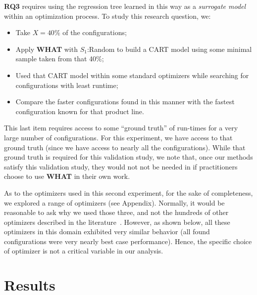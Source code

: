 \documentclass{sig-alternative}
\newcommand{\bi}{\begin{itemize}}%
\newcommand{\ei}{\end{itemize}}
\newcommand{\what}{{\bf WHAT }}
\begin{document}
{\bf RQ3} requires using the regression tree learned in this way as a {\em surrogate model} within an optimization process. To study this research question, we:
\bi
\item Take   $X=40\%$ of the configurations;
\item Apply \what with $S_1$:Random to build a CART model using some minimal sample taken from that 40\%;
\item Used that CART model within some standard optimizers while searching for 
configurations with least runtime;
\item  Compare the faster configurations found in this manner with the fastest configuration
known for that product line.
\ei
This last item requires access to some ``ground truth'' of run-times for a very
large number of configurations. For this experiment, we have access to that ground truth
(since we have access to nearly all the configurations). While that ground truth is required for this
validation study, we note that, once our methods satisfy this validation study,
they would not not be needed in if practitioners choose to use \what in their own work.

As to the optimizers used in this second experiment, for the sake of completeness, we explored
a range of optimizers (see Appendix).  Normally,
it would be  reasonable to ask
why we used those three, and not the hundreds of other 
optimizers described in the literature~\cite{fletcher13,harman12}. However,
as shown below, all these optimizers in this
domain exhibited  very similar
behavior (all found configurations were very nearly
best case performance). Hence, the specific
choice of optimizer is not a critical
variable in  our analysis.


\section{Results}
\end{document}

